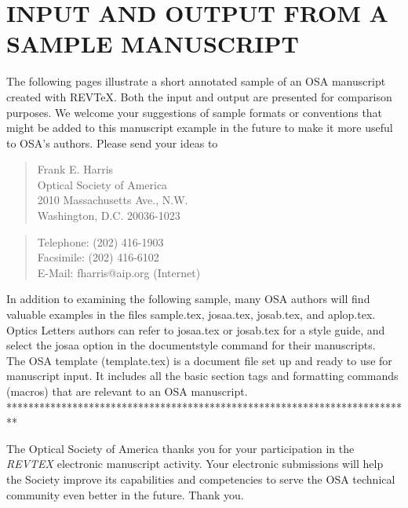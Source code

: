 \section{  INPUT AND OUTPUT FROM A SAMPLE MANUSCRIPT}

     The following pages illustrate a short annotated sample of
an OSA manuscript created with REV\TeX.  Both the input and output
are presented for comparison purposes. We welcome your suggestions
of sample formats or conventions
that might be added to this manuscript example in the future to
make it more useful to OSA's authors.  Please send your ideas to
\begin{quote}
          Frank E. Harris  \\
          Optical Society of America   \\
          2010 Massachusetts Ave., N.W.\\
          Washington, D.C.  20036-1023 \\
\end{quote}
\begin{quote}
     Telephone:  (202) 416-1903   \\
     Facsimile:  (202) 416-6102   \\
     E-Mail: fharris@aip.org (Internet) \\
\end{quote}


In addition to examining the following sample, many OSA authors
will find valuable examples in the files sample.tex, josaa.tex,
josab.tex, and aplop.tex.  Optics Letters
authors can refer to josaa.tex or
josab.tex for a style guide, and select the josaa option in the
documentstyle command for their manuscripts. \\

     The OSA template (template.tex) is a document file set up
and ready to use for manuscript input.  It includes all the basic
section tags and formatting commands (macros) that are relevant
to an OSA manuscript. \\


**************************************************************************


     The Optical Society of America thanks you for your participation
in the {\it REVTEX} electronic manuscript activity.  Your electronic
submissions will help the Society improve its capabilities and
competencies to serve the OSA technical community even better in the
future.  Thank you.



